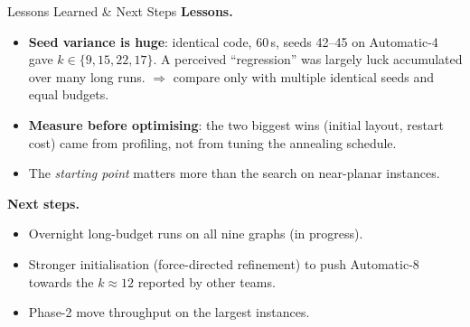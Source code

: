 \begin{frame}{Lessons Learned \& Next Steps}
  \textbf{Lessons.}
  \begin{itemize}
    \item \textbf{Seed variance is huge}: identical code, 60\,s, seeds 42--45 on Automatic-4
          gave $k\in\{9,15,22,17\}$. A perceived ``regression'' was largely luck accumulated
          over many long runs. $\Rightarrow$ compare only with multiple identical seeds and equal budgets.
    \item \textbf{Measure before optimising}: the two biggest wins (initial layout, restart cost)
          came from profiling, not from tuning the annealing schedule.
    \item The \emph{starting point} matters more than the search on near-planar instances.
  \end{itemize}
  \medskip
  \textbf{Next steps.}
  \begin{itemize}
    \item Overnight long-budget runs on all nine graphs (in progress).
    \item Stronger initialisation (force-directed refinement) to push Automatic-8 towards
          the $k\approx 12$ reported by other teams.
    \item Phase-2 move throughput on the largest instances.
  \end{itemize}
\end{frame}
